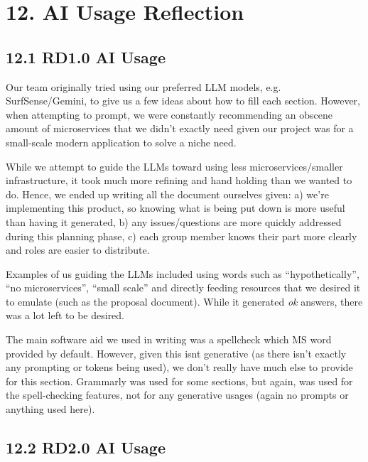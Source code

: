 \documentclass[
]{article}
\begin{document}
\hypertarget{ai-usage-reflection}{%
\section{12. AI Usage Reflection}\label{ai-usage-reflection}}

\hypertarget{rd1.0-ai-usage}{%
\subsection{12.1 RD1.0 AI Usage}\label{rd1.0-ai-usage}}

Our team originally tried using our preferred LLM models, e.g.
SurfSense/Gemini, to give us a few ideas about how to fill each section.
However, when attempting to prompt, we were constantly recommending an
obscene amount of microservices that we didn't exactly need given our
project was for a small-scale modern application to solve a niche need.

While we attempt to guide the LLMs toward using less
microservices/smaller infrastructure, it took much more refining and
hand holding than we wanted to do. Hence, we ended up writing all the
document ourselves given: a) we're implementing this product, so knowing
what is being put down is more useful than having it generated, b) any
issues/questions are more quickly addressed during this planning phase,
c) each group member knows their part more clearly and roles are easier
to distribute.

Examples of us guiding the LLMs included using words such as
``hypothetically'', ``no microservices'', ``small scale'' and directly
feeding resources that we desired it to emulate (such as the proposal
document). While it generated \emph{ok} answers, there was a lot left to
be desired.

The main software aid we used in writing was a spellcheck which MS word
provided by default. However, given this isn\textquotesingle t
generative (as there isn't exactly any prompting or tokens being used),
we don't really have much else to provide for this section. Grammarly
was used for some sections, but again, was used for the spell-checking
features, not for any generative usages (again no prompts or anything
used here).

\hypertarget{rd2.0-ai-usage}{%
\subsection{12.2 RD2.0 AI Usage}\label{rd2.0-ai-usage}}
\end{document}
